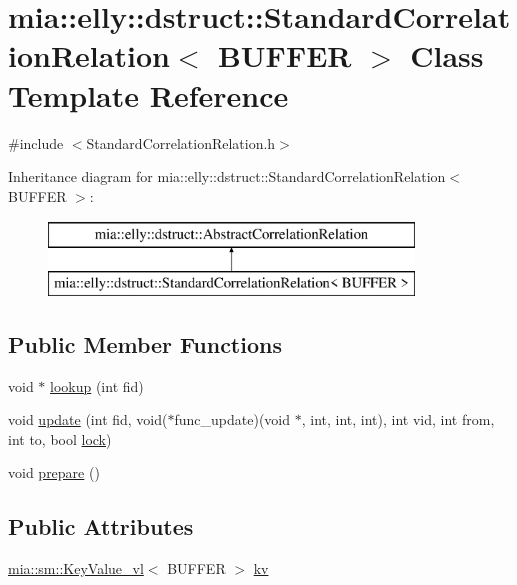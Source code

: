 \hypertarget{classmia_1_1elly_1_1dstruct_1_1_standard_correlation_relation}{\section{mia\-:\-:elly\-:\-:dstruct\-:\-:Standard\-Correlation\-Relation$<$ B\-U\-F\-F\-E\-R $>$ Class Template Reference}
\label{classmia_1_1elly_1_1dstruct_1_1_standard_correlation_relation}
}


{\ttfamily \#include $<$Standard\-Correlation\-Relation.\-h$>$}

Inheritance diagram for mia\-:\-:elly\-:\-:dstruct\-:\-:Standard\-Correlation\-Relation$<$ B\-U\-F\-F\-E\-R $>$\-:\begin{figure}[H]
\begin{center}
\leavevmode
\includegraphics[height=2.000000cm]{classmia_1_1elly_1_1dstruct_1_1_standard_correlation_relation}
\end{center}
\end{figure}
\subsection*{Public Member Functions}
\begin{DoxyCompactItemize}
\item 
void $\ast$ \hyperlink{classmia_1_1elly_1_1dstruct_1_1_standard_correlation_relation_a0dfecae5ae55c35f407fc9fb44c216b0}{lookup} (int fid)
\item 
void \hyperlink{classmia_1_1elly_1_1dstruct_1_1_standard_correlation_relation_a8f71e78c27dabff352a2ec8bb532b82e}{update} (int fid, void($\ast$func\-\_\-update)(void $\ast$, int, int, int), int vid, int from, int to, bool \hyperlink{classmia_1_1elly_1_1dstruct_1_1_abstract_correlation_relation_a3291f1afe2252b5bc97414a96c035505}{lock})
\item 
void \hyperlink{classmia_1_1elly_1_1dstruct_1_1_standard_correlation_relation_ab6c7a97c05bca478980248a7dc466a02}{prepare} ()
\end{DoxyCompactItemize}
\subsection*{Public Attributes}
\begin{DoxyCompactItemize}
\item 
\hyperlink{classmia_1_1sm_1_1_key_value__vl}{mia\-::sm\-::\-Key\-Value\-\_\-vl}$<$ B\-U\-F\-F\-E\-R $>$ \hyperlink{classmia_1_1elly_1_1dstruct_1_1_standard_correlation_relation_a2648351b09b9c655802691f8e1c61cfb}{kv}
\end{DoxyCompactItemize}


